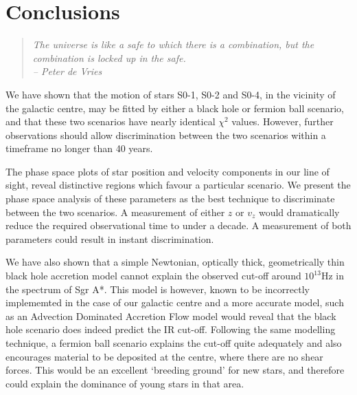 \section{Conclusions}
\begin{quotation}
	\raggedleft \it The universe is like a safe to which there is a combination, but the combination is locked up in the safe.\\
	-- Peter de Vries
\end{quotation}
We have shown that the motion of stars S0-1, S0-2 and S0-4, in the vicinity of the galactic centre, may be fitted by either a black hole
or fermion ball scenario, and that these two scenarios have nearly identical $\chi^2$ values. However, further observations should allow
discrimination between the two scenarios within a timeframe no longer than 40 years.

The phase space plots of star position and velocity components in our line of sight, reveal distinctive
regions which favour a particular scenario. We present the phase space analysis of these parameters as the best
technique to discriminate between the two scenarios.
A measurement of either $z$ or $v_z$ would dramatically reduce the required observational time to under a decade.
A measurement of both parameters could result in instant discrimination.

We have also shown that a simple Newtonian, optically thick, geometrically thin black hole accretion model cannot explain the observed
cut-off around $10^{13}$Hz in the spectrum of Sgr A*.
This model is however, known to be incorrectly implememted in the case of our galactic centre and a more accurate model, such as
an Advection Dominated Accretion Flow model would reveal that the black hole scenario does indeed predict the IR cut-off.
Following the same modelling technique, a fermion ball scenario explains the cut-off quite adequately and also
encourages material to be deposited at the centre, where there are no shear forces. This would be an excellent `breeding ground'
for new stars, and therefore could explain the dominance of young stars in that area.
